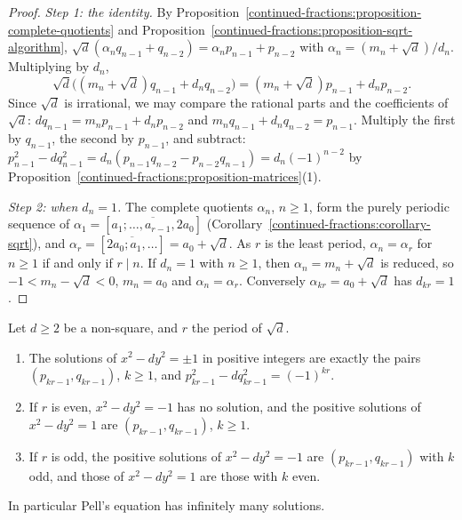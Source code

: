 \begin{proof}
\emph{Step 1: the identity.} By Proposition~\ref{continued-fractions:proposition-complete-quotients} and Proposition~\ref{continued-fractions:proposition-sqrt-algorithm},
$\sqrt d(\alpha_nq_{n-1} + q_{n-2}) = \alpha_np_{n-1} + p_{n-2}$ with $\alpha_n = (m_n + \sqrt d)/d_n$. Multiplying by $d_n$,
\[
\sqrt d\bigl((m_n + \sqrt d)q_{n-1} + d_nq_{n-2}\bigr) = (m_n + \sqrt d)p_{n-1} + d_np_{n-2}.
\]
Since $\sqrt d$ is irrational, we may compare the rational parts and the coefficients of $\sqrt d$: $dq_{n-1} = m_np_{n-1} + d_np_{n-2}$ and $m_nq_{n-1} + d_nq_{n-2} = p_{n-1}$. Multiply the
first by $q_{n-1}$, the second by $p_{n-1}$, and subtract:
$p_{n-1}^2 - dq_{n-1}^2 = d_n(p_{n-1}q_{n-2} - p_{n-2}q_{n-1}) = d_n(-1)^{n-2}$ by Proposition~\ref{continued-fractions:proposition-matrices}(1).

\emph{Step 2: when $d_n = 1$.} The complete quotients $\alpha_n$, $n \geq 1$, form the purely periodic sequence of $\alpha_1 = [\overline{a_1; \ldots, a_{r-1}, 2a_0}]$ (Corollary~\ref{continued-fractions:corollary-sqrt}),
and $\alpha_r = [\overline{2a_0; a_1, \ldots}] = a_0 + \sqrt d$. As $r$ is the least period, $\alpha_n = \alpha_r$ for $n \geq 1$ if and only if $r \mid n$. If $d_n = 1$ with $n \geq 1$, then
$\alpha_n = m_n + \sqrt d$ is reduced, so $-1 < m_n - \sqrt d < 0$, $m_n = a_0$ and $\alpha_n = \alpha_r$. Conversely $\alpha_{kr} = a_0 + \sqrt d$ has $d_{kr} = 1$.
\end{proof}

\begin{theorem}\label{continued-fractions:theorem-pell}
Let $d \geq 2$ be a non-square, and $r$ the period of $\sqrt d$.
\begin{enumerate}
\item The solutions of $x^2 - dy^2 = \pm 1$ in positive integers are exactly the pairs $(p_{kr-1}, q_{kr-1})$, $k \geq 1$, and $p_{kr-1}^2 - dq_{kr-1}^2 = (-1)^{kr}$.
\item If $r$ is even, $x^2 - dy^2 = -1$ has no solution, and the positive solutions of $x^2 - dy^2 = 1$ are $(p_{kr-1}, q_{kr-1})$, $k \geq 1$.
\item If $r$ is odd, the positive solutions of $x^2 - dy^2 = -1$ are $(p_{kr-1}, q_{kr-1})$ with $k$ odd, and those of $x^2 - dy^2 = 1$ are those with $k$ even.
\end{enumerate}
In particular Pell's equation has infinitely many solutions.
\end{theorem}

